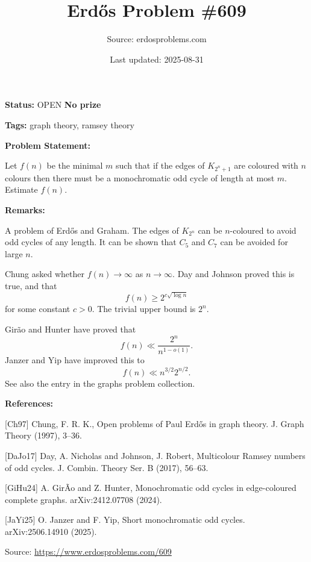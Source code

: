 \documentclass{article}
\title{Erd\H{o}s Problem \#609}
\date{Last updated: 2025-08-31}
\author{Source: erdosproblems.com}
\begin{document}
\maketitle

\noindent\textbf{Status:} OPEN \quad \textbf{No prize}

\noindent\textbf{Tags:} graph theory, ramsey theory

\medskip
\noindent\textbf{Problem Statement:}

Let $f(n)$ be the minimal $m$ such that if the edges of $K_{2^n+1}$ are coloured with $n$ colours then there must be a monochromatic odd cycle of length at most $m$. Estimate $f(n)$.

\bigskip
\noindent\textbf{Remarks:}

A problem of Erd\H{o}s and Graham. The edges of $K_{2^n}$ can be $n$-coloured to avoid odd cycles of any length. It can be shown that $C_5$ and $C_7$ can be avoided for large $n$.

Chung \cite{Ch97} asked whether $f(n)\to \infty$ as $n\to \infty$. Day and Johnson \cite{DaJo17} proved this is true, and that\[f(n)\geq 2^{c\sqrt{\log n}}\]for some constant $c>0$. The trivial upper bound is $2^n$.

Gir\~{a}o and Hunter \cite{GiHu24} have proved that\[f(n) \ll \frac{2^n}{n^{1-o(1)}}.\]Janzer and Yip \cite{JaYi25} have improved this to\[f(n) \ll n^{3/2}2^{n/2}.\]See also the entry in the graphs problem collection.

\bigskip
\noindent\textbf{References:}

[Ch97] Chung, F. R. K., Open problems of {P}aul Erd\H{o}s in graph theory. J. Graph Theory (1997), 3--36.
 
 [DaJo17] Day, A. Nicholas and Johnson, J. Robert, Multicolour {R}amsey numbers of odd cycles. J. Combin. Theory Ser. B (2017), 56--63.
 
 [GiHu24] A. Gir\~Ao and Z. Hunter, Monochromatic odd cycles in edge-coloured complete graphs. arXiv:2412.07708 (2024).
 
 [JaYi25] O. Janzer and F. Yip, Short monochromatic odd cycles. arXiv:2506.14910 (2025).

\bigskip
\noindent\small{Source: \url{https://www.erdosproblems.com/609}}
\end{document}
